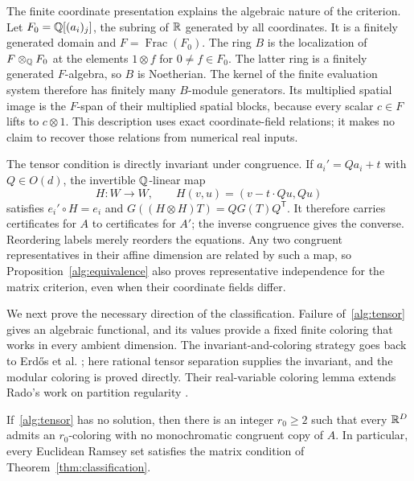 \begin{remark}\label{alg:noetherian}
The finite coordinate presentation explains the algebraic nature of the
criterion.  Let $F_0=\mathbb Q[(a_i)_j]$, the subring of $\mathbb R$ generated by all
coordinates.  It is a finitely generated domain and $F=\operatorname{Frac}(F_0)$.
The ring $B$ is the localization of $F\otimes_{\mathbb Q}F_0$ at the elements
$1\otimes f$ for $0\ne f\in F_0$.  The latter ring is a finitely generated
$F$-algebra, so $B$ is Noetherian.
The kernel of the finite evaluation system therefore has finitely many
$B$-module generators.  Its multiplied spatial image is the $F$-span of
their multiplied spatial blocks, because every scalar $c\in F$ lifts to
$c\otimes1$.  This description uses exact coordinate-field relations;
it makes no claim to recover those relations from numerical real inputs.
\end{remark}

\begin{remark}\label{alg:congruence}
The tensor condition is directly invariant under congruence.
If $a_i'=Qa_i+t$ with $Q\in O(d)$, the invertible $\mathbb Q$-linear map
\[
 H:W\longrightarrow W,\qquad
 H(v,u)=(v-t\cdot Qu,Qu)
\]
satisfies $e_i'\circ H=e_i$ and
$G((H\otimes H)T)=QG(T)Q^{\mathsf T}$.
It therefore carries certificates for $A$ to certificates for $A'$;
the inverse congruence gives the converse.  Reordering labels merely
reorders the equations.  Any two congruent representatives in their
affine dimension are related by such a map, so
Proposition~\ref{alg:equivalence} also proves representative independence
for the matrix criterion, even when their coordinate fields differ.
\end{remark}

We next prove the necessary direction of the classification.
Failure of~\eqref{alg:tensor} gives an algebraic functional, and its values
provide a fixed finite coloring that works in every ambient dimension.
The invariant-and-coloring strategy goes back to Erd\H{o}s et al.
\cite[Theorem~13 and Lemma~15]{egm-rss}; here rational tensor separation
supplies the invariant, and the modular coloring is proved directly.
Their real-variable coloring lemma extends Rado's work on partition
regularity \cite{rado-note}.

\begin{proposition}\label{alg:necessity}
If~\eqref{alg:tensor} has no solution, then there is an integer $r_0\geq2$
such that every $\mathbb R^D$ admits an $r_0$-coloring with no monochromatic
congruent copy of $A$.  In particular, every Euclidean Ramsey set
satisfies the matrix condition of Theorem~\ref{thm:classification}.
\end{proposition}

